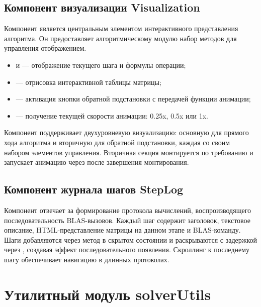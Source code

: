 \documentclass[12pt, oneside]{book}
\begin{document}
\subsection{Компонент визуализации Visualization}

    \quad Компонент \texttt{} является центральным элементом интерактивного представления алгоритма. Он предоставляет алгоритмическому модулю набор методов для управления отображением.

\begin{itemize}
    \item \texttt{} и \texttt{} --- отображение текущего шага и формулы операции;
    \item \texttt{} --- отрисовка интерактивной таблицы матрицы;
    \item \texttt{} --- активация кнопки обратной подстановки с передачей функции анимации;
    \item \texttt{} --- получение текущей скорости анимации: 0.25x, 0.5x или 1x.
\end{itemize}

    \quad Компонент поддерживает двухуровневую визуализацию: основную для прямого хода алгоритма и вторичную для обратной подстановки, каждая со своим набором элементов управления. Вторичная секция монтируется по требованию и запускает анимацию через \texttt{} после завершения монтирования.

\subsection{Компонент журнала шагов StepLog}

    \quad Компонент \texttt{} отвечает за формирование протокола вычислений, воспроизводящего последовательность BLAS-вызовов. Каждый шаг содержит заголовок, текстовое описание, HTML-представление матрицы на данном этапе и BLAS-команду. Шаги добавляются через метод \texttt{} в скрытом состоянии и раскрываются с задержкой через \texttt{}, создавая эффект последовательного появления. Скроллинг к последнему шагу обеспечивает навигацию в длинных протоколах.

\section{Утилитный модуль solverUtils}
\end{document}
